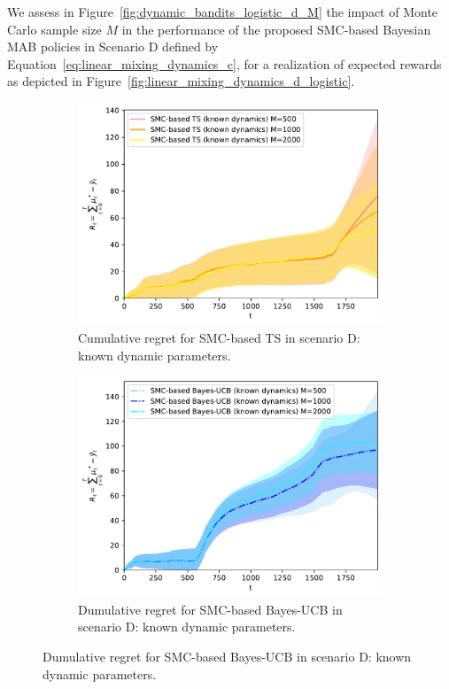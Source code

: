 \clearpage
We assess in Figure~\ref{fig:dynamic_bandits_logistic_d_M} the impact of Monte Carlo sample size $M$ in the performance of the proposed SMC-based Bayesian MAB policies
in Scenario D defined by Equation~\eqref{eq:linear_mixing_dynamics_c},
for a realization of expected rewards as depicted in Figure~\ref{fig:linear_mixing_dynamics_d_logistic}.

\begin{figure}[!h]
	\centering
	\begin{subfigure}[b]{0.45\textwidth}
		\includegraphics[width=\textwidth]{./fods_figs/dynamic/logistic/d_selectedM_cumulative_regret_dknown_ts}
		\caption{Cumulative regret for SMC-based TS in scenario D: known dynamic parameters.}
		\label{fig:dynamic_bandits_logistic_d_ts_dknown_M}
	\end{subfigure}\qquad
	\begin{subfigure}[b]{0.45\textwidth}
		\includegraphics[width=\textwidth]{./fods_figs/dynamic/logistic/d_selectedM_cumulative_regret_dknown_bucb}
		\caption{Dumulative regret for SMC-based Bayes-UCB in scenario D: known dynamic parameters.}
		\label{fig:dynamic_bandits_logistic_d_bucb_dknown_M}
	\end{subfigure}
	

\end{figure}

